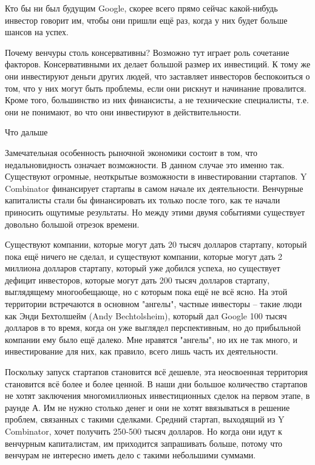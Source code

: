 \documentclass[ebook,12pt,oneside,openany]{memoir}
\begin{document}
Кто бы ни был будущим Google, скорее всего прямо сейчас какой-нибудь
инвестор говорит им, чтобы они пришли ещё раз, когда у них будет
больше шансов на успех.

Почему венчуры столь консервативны? Возможно тут играет роль сочетание
факторов. Консервативными их делает большой размер их инвестиций. К
тому же они инвестируют деньги других людей, что заставляет инвесторов
беспокоиться о том, что у них могут быть проблемы, если они рискнут и
начинание провалится. Кроме того, большинство из них финансисты, а не
технические специалисты, т.е. они не понимают, во что они инвестируют
в действительности.

Что дальше

Замечательная особенность рыночной экономики состоит в том, что
недальновидность означает возможности. В данном случае это именно так.
Существуют огромные, неоткрытые возможности в инвестировании
стартапов. Y Combinator финансирует стартапы в самом начале их
деятельности. Венчурные капиталисты стали бы финансировать их только
после того, как те начали приносить ощутимые результаты. Но между
этими двумя событиями существует довольно большой отрезок времени.

Существуют компании, которые могут дать 20 тысяч долларов стартапу,
который пока ещё ничего не сделал, и существуют компании, которые
могут дать 2 миллиона долларов стартапу, который уже добился успеха,
но существует дефицит инвесторов, которые могут дать 200 тысяч
долларов стартапу, выглядящему многообещающе, но с которым пока ещё не
всё ясно. На этой территории встречаются в основном "ангелы", частные
инвесторы -- такие люди как Энди Бехтолшейм (Andy Bechtolsheim),
который дал Google 100 тысяч долларов в то время, когда он уже
выглядел перспективным, но до прибыльной компании ему было ещё далеко.
Мне нравятся "ангелы", но их не так много, и инвестирование для них,
как правило, всего лишь часть их деятельности.

Поскольку запуск стартапов становится всё дешевле, эта неосвоенная
территория становится всё более и более ценной. В наши дни большое
количество стартапов не хотят заключения многомиллионых инвестиционных
сделок на первом этапе, в раунде А. Им не нужно столько денег и они не
хотят ввязываться в решение проблем, связанных с такими сделками.
Средний стартап, выходящий из Y Combinator, хочет получить 250-500
тысяч долларов. Но когда они идут к венчурным капиталистам, им
приходится запрашивать больше, потому что венчурам не интересно иметь
дело с такими небольшими суммами.
\end{document}
